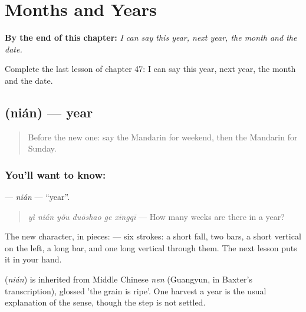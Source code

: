 
\chapter{Months and Years}
\label{ch:zh-months-and-years}

\begin{chapteropening}
\textbf{By the end of this chapter:} \emph{I can say this year, next year, the month and the date.}

Complete the last lesson of chapter 47: I can say this year, next year, the month and the date.
\end{chapteropening}

\section[\texorpdfstring{\zh{年} (nián)}{年 (nián)}]{ (nián) — year}

\label{lesson:ZH-C47-nian}



\begin{quote}
Before the new one: say the Mandarin for weekend, then the Mandarin for Sunday.
\end{quote}

\subsection*{You'll want to know: }
\textbf{} — \emph{nián} — \textquotedblleft{}year\textquotedblright{}.

\begin{quote}
\textbf{} \emph{yì nián yǒu duōshao ge xīngqī} — How many weeks are there in a year?
\end{quote}

The new character, in pieces:  — six strokes: a short fall, two bars, a short vertical on the left, a long bar, and one long vertical through them. The next lesson puts it in your hand.

\begin{cousinweb}
\textbf{} (\emph{nián}) is inherited from Middle Chinese \emph{nen} (Guangyun, in Baxter's transcription), glossed 'the grain is ripe'. One harvest a year is the usual explanation of the sense, though the step is not settled.
\end{cousinweb}

